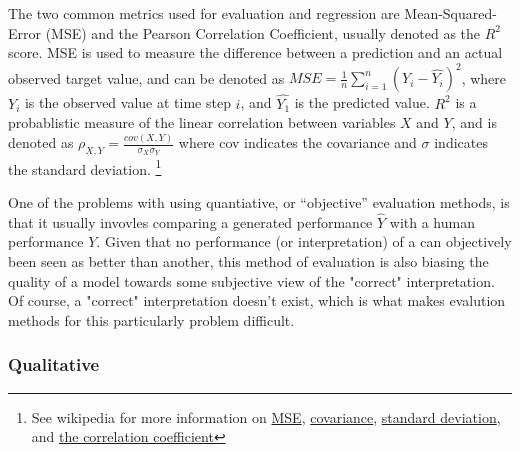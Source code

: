 The two common metrics used for evaluation and regression are Mean-Squared-Error (MSE) and the Pearson Correlation Coefficient, usually denoted as the $R^2$ score. MSE is used to measure the difference between a prediction and an actual observed target value, and can be denoted as $MSE = \frac{1}{n}\sum_{i=1}^{n}(Y_i - \hat{Y_i})^2$, where $Y_i$ is the observed value at time step $i$, and $\hat{Y_1}$ is the predicted value. $R^2$ is a probablistic measure of the linear correlation between variables $X$ and $Y$, and is denoted as $\rho_{X,Y} = \frac{cov(X,Y)}{\sigma_{X}\sigma_{Y}}$ where cov indicates the covariance and $\sigma$ indicates the standard deviation. \footnote{See wikipedia for more information on \href{https://en.wikipedia.org/wiki/Mean_squared_error}{MSE}, \href{https://en.wikipedia.org/wiki/Covariance}{covariance}, \href{https://en.wikipedia.org/wiki/Standard_deviation}{standard deviation}, and \href{https://en.wikipedia.org/wiki/Pearson_correlation_coefficient}{the correlation coefficient}}

One of the problems with using quantiative, or ``objective''  evaluation methods, is that it usually invovles comparing a generated performance $\hat{Y}$ with a human performance ${Y}$. Given that no performance (or interpretation) of a can objectively been seen as better than another, this method of evaluation is also biasing the quality of a model towards some subjective view of the "correct" interpretation. Of course, a "correct" interpretation doesn't exist, which is what makes evalution methods for this particularly problem difficult. 


\subsubsection{Qualitative}
